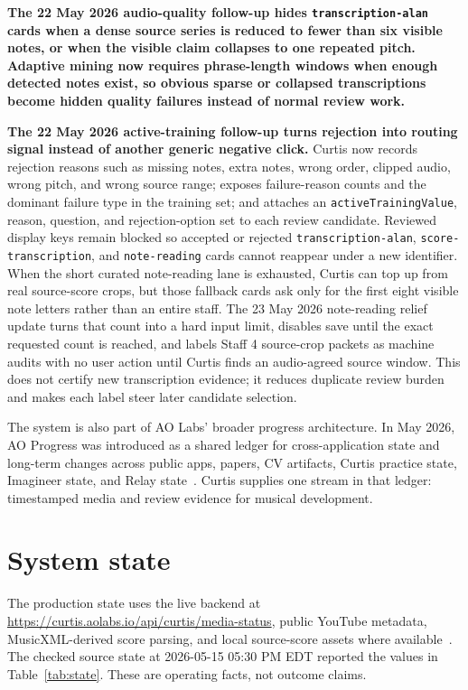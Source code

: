 \documentclass[12pt,letterpaper]{article}
\begin{document}
\noindent\textbf{The 22 May 2026 audio-quality follow-up hides \texttt{transcription-alan} cards when a dense source series is reduced to fewer than six visible notes, or when the visible claim collapses to one repeated pitch. Adaptive mining now requires phrase-length windows when enough detected notes exist, so obvious sparse or collapsed transcriptions become hidden quality failures instead of normal review work.}

\noindent\textbf{The 22 May 2026 active-training follow-up turns rejection into routing signal instead of another generic negative click.} Curtis now records rejection reasons such as missing notes, extra notes, wrong order, clipped audio, wrong pitch, and wrong source range; exposes failure-reason counts and the dominant failure type in the training set; and attaches an \texttt{activeTrainingValue}, reason, question, and rejection-option set to each review candidate. Reviewed display keys remain blocked so accepted or rejected \texttt{transcription-alan}, \texttt{score-transcription}, and \texttt{note-reading} cards cannot reappear under a new identifier. When the short curated note-reading lane is exhausted, Curtis can top up from real source-score crops, but those fallback cards ask only for the first eight visible note letters rather than an entire staff. The 23 May 2026 note-reading relief update turns that count into a hard input limit, disables save until the exact requested count is reached, and labels Staff 4 source-crop packets as machine audits with no user action until Curtis finds an audio-agreed source window. This does not certify new transcription evidence; it reduces duplicate review burden and makes each label steer later candidate selection.

The system is also part of AO Labs' broader progress architecture. In May 2026, AO Progress was introduced as a shared ledger for cross-application state and long-term changes across public apps, papers, CV artifacts, Curtis practice state, Imagineer state, and Relay state~\cite{progress_app_2026}. Curtis supplies one stream in that ledger: timestamped media and review evidence for musical development.

\section{System state}

The production state uses the live backend at \url{https://curtis.aolabs.io/api/curtis/media-status}, public YouTube metadata, MusicXML-derived score parsing, and local source-score assets where available~\cite{youtube_data_api_2026,musicxml_2026,imslp_2026}. The checked source state at 2026-05-15 05:30 PM EDT reported the values in Table~\ref{tab:state}. These are operating facts, not outcome claims.
\end{document}
